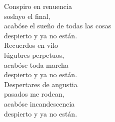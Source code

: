 \newenvironment{dedication}{
\thispagestyle{empty}
\vspace*{3.3\baselineskip}
}{\clearpage}

\begin{dedication}
Conspiro en renuencia\\
soslayo el final,\\
acabóse el sueño de todas las cosas\\
despierto y ya no están.\\

Recuerdos en vilo\\
lúgubres perpetuos,\\
acabóse toda marcha\\
despierto y ya no están.\\

Despertares de angustia\\
pasados me rodean,\\
acabóse incandescencia\\
despierto y ya no están.\\
\end{dedication}
